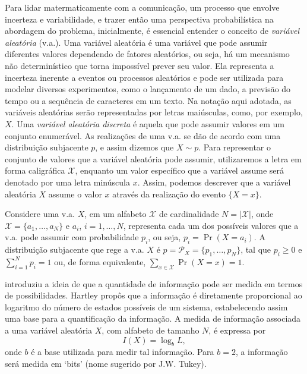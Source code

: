 Para lidar matermaticamente com a comunicação, um processo que envolve
incerteza e variabilidade, e trazer então uma perspectiva probabilística na
abordagem do problema, inicialmente, é essencial entender o conceito de
\emph{variável aleatória} (v.a.). Uma variável aleatória é uma variável que pode
assumir diferentes valores dependendo de fatores aleatórios, ou seja, há
um mecanismo não determinístico que torna impossível prever seu valor. Ela
representa a incerteza inerente a eventos ou processos aleatórios e pode ser
utilizada para modelar diversos experimentos, como o lançamento de um dado, a
previsão do tempo ou a sequência de caracteres em um texto. Na notação aqui
adotada, as variáveis aleatórias serão representadas por letras maiúsculas,
como, por exemplo, $X$. Uma \emph{variável aleatória discreta} é aquela que pode
assumir valores em um conjunto enumerável. As realizações de uma v.a. se dão de
acordo com uma distribuição subjacente $p$, e assim dizemos que $X \sim p$.
Para representar o conjunto de valores que a variável aleatória pode assumir,
utilizaremos a letra em forma caligráfica $\mathcal{X}$, enquanto um valor
específico que a variável assume será denotado por uma letra minúscula
$x$. Assim, podemos descrever que a variável aleatória $X$ assume o valor
$x$ através da realização do evento $\{X=x\}$. 

Considere uma v.a. $X$, em um alfabeto $\mathcal{X}$ de cardinalidade $N = \vert\mathcal{X}\vert$,
onde $\mathcal{X} = \{a_1,\ldots,a_N\}$ e $a_i$, $i=1,\ldots,N$, representa
cada um dos possíveis valores que a v.a. pode assumir com probabilidade $p_i$, ou seja,
$p_i = \Pr(X=a_i)$. A distribuição subjacente que rege a v.a. $X$ é
$p = \mathcal{P}_X = \{p_1, \ldots, p_N\}$, tal que $p_i \geq 0$ e $\sum_{i=1}^N p_i = 1$ ou,
de forma equivalente, $\sum_{x \in \mathcal{X}} \Pr(X=x) = 1$.


\textcite{hartley1928} introduziu a ideia de que a quantidade de informação pode
ser medida em termos de possibilidades. Hartley propôs que a informação é
diretamente proporcional ao logaritmo do número de estados possíveis de um
sistema, estabelecendo assim uma base para a quantificação da informação. A
medida de informação associada a uma variável aleatória $X$, com alfabeto de
tamanho $N$, é expressa por
%
\begin{equation}\label{eq-hartley}
I(X) = \log_b L ,
\end{equation}
%
onde $b$ é a base utilizada para medir tal informação. Para $b=2$, a informação
será medida em `bits' (nome sugerido por J.W. Tukey).

